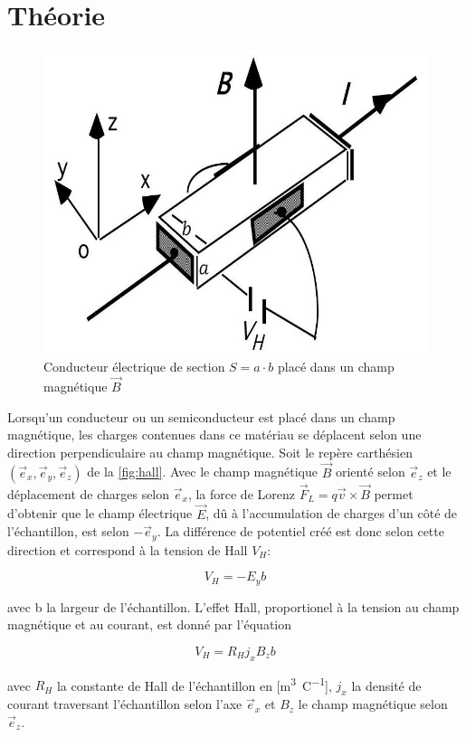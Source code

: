 \section{Théorie}

\begin{minipage}{\textwidth}
    \begin{figure}
        \centering
        \includegraphics[width=\linewidth]{figures/hall.png}
        \caption{Conducteur électrique de section \(S = a \cdot b\) placé dans un champ magnétique \(\vec{B}\) \cite{notice}}
        \label{fig:hall}
        \vspace*{1cm}
    \end{figure}

    Lorsqu'un conducteur ou un semiconducteur est placé dans un champ magnétique, les charges contenues dans ce matériau se déplacent selon une direction perpendiculaire au champ magnétique. Soit le repère carthésien \((\vec{e}_x,\vec{e}_y,\vec{e}_z)\) de la \autoref{fig:hall}. Avec le champ magnétique \(\vec{B}\) orienté selon \(\vec{e}_z\) et le déplacement de charges selon \(\vec{e}_x\), la force de Lorenz \(\vec{F}_L = q\vec{v} \times \vec{B}\) permet d'obtenir que le champ électrique \(\vec{E}\), dû à l'accumulation de charges d'un côté de l'échantillon, est selon \(-\vec{e}_y\). La différence de potentiel créé est donc selon cette direction et correspond à la tension de Hall \(V_H\):

    \begin{equation}
        V_H = -E_yb
    \end{equation}

    avec b la largeur de l'échantillon. L'effet Hall, proportionel à la tension au champ magnétique et au courant, est donné par l'équation

    \begin{equation}
        V_H = R_H j_x B_z b
        \label{eq:effet_hall}
    \end{equation}

    avec \(R_H\) la constante de Hall de l'échantillon en [\si{\meter\cubed\per\coulomb}], \(j_x\) la densité de courant traversant l'échantillon selon l'axe \(\vec{e}_x\) et \(B_z\) le champ magnétique selon \(\vec{e}_z\). \cite{notice}
\end{minipage}
